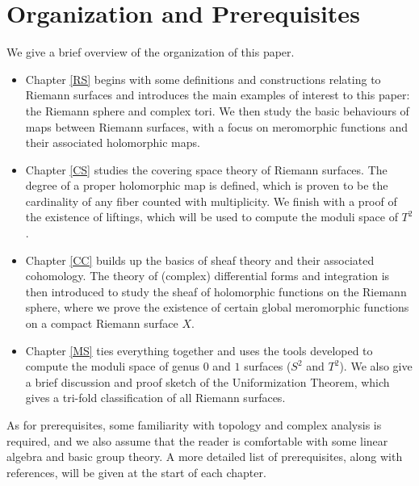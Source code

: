 \documentclass[../Moduli_Spaces_of_Riemann_Surfaces.tex]{subfiles}
\begin{document}
    \section{Organization and Prerequisites}
    We give a brief overview of the organization of this paper.
    \begin{itemize}
        \item Chapter \ref{RS} begins with some definitions and constructions relating to Riemann surfaces and introduces the main examples of interest to this paper: the Riemann sphere and complex tori. We then study the basic behaviours of maps between Riemann surfaces, with a focus on meromorphic functions and their associated holomorphic maps.
            \vspace{-0.05in}
        \item Chapter \ref{CS} studies the covering space theory of Riemann surfaces. The degree of a proper holomorphic map is defined, which is proven to be the cardinality of any fiber counted with multiplicity. We finish with a proof of the existence of liftings, which will be used to compute the moduli space of $T^2$.
            \vspace{-0.05in}
        \item Chapter \ref{CC} builds up the basics of sheaf theory and their associated cohomology. The theory of (complex) differential forms and integration is then introduced to study the sheaf of holomorphic functions on the Riemann sphere, where we prove the existence of certain global meromorphic functions on a compact Riemann surface $X$.
            \vspace{-0.05in}
        \item Chapter \ref{MS} ties everything together and uses the tools developed to compute the moduli space of genus $0$ and $1$ surfaces ($S^2$ and $T^2$). We also give a brief discussion and proof sketch of the Uniformization Theorem, which gives a tri-fold classification of all Riemann surfaces.
    \end{itemize}
    As for prerequisites, some familiarity with topology and complex analysis is required, and we also assume that the reader is comfortable with some linear algebra and basic group theory. A more detailed list of prerequisites, along with references, will be given at the start of each chapter.
\end{document}
